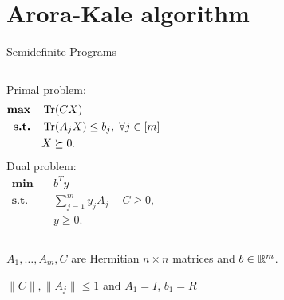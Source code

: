 
\section{Arora-Kale algorithm}

\begin{frame}{Semidefinite Programs}
 \begin{columns}
  Primal problem:
  \begin{align*}
    \textbf{max} & \quad \operatorname{Tr}(CX) \\
    \textbf{s.t.} & \quad \operatorname{Tr}(A_j X) \leq b_j,\;\forall j \in [m] \\
		      & \quad X \succeq 0.
  \end{align*}
  Dual problem:
  \begin{align*}
    \textbf{min} & \quad b^T y \\
    \textbf{s.t.} & \quad \sum_{j=1}^m y_j A_j - C \geq 0, \\
		      & \quad y \geq 0.
  \end{align*}
 \end{columns}
 
 \vspace{2\floatsep}
 
 $A_1,\dots,A_m,C$ are Hermitian $n\times n$ matrices and $b\in\mathbb{R}^m$.
 
 \vspace{2\floatsep}
 
  $\|C\|, \|A_j\| \leq 1$ and $A_1 = I$, $b_1 = R$
\end{frame}



